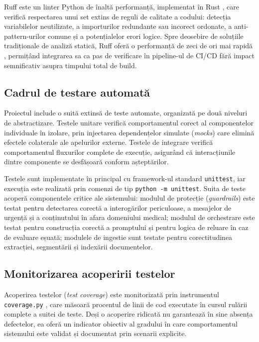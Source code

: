 \documentclass[12pt, a4paper, oneside, romanian]{teza-upb}
\begin{document}
Ruff este un linter Python de înaltă performanță, implementat în Rust \cite{ruff_doc}, care verifică respectarea unui set extins de reguli de calitate a codului: detecția variabilelor neutilizate, a importurilor redundante sau incorect ordonate, a anti-pattern-urilor comune și a potențialelor erori logice. Spre deosebire de soluțiile tradiționale de analiză statică, Ruff oferă o performanță de zeci de ori mai rapidă \cite{ruff_doc}, permițând integrarea sa ca pas de verificare în pipeline-ul de CI/CD fără impact semnificativ asupra timpului total de build.

\subsection{Cadrul de testare automată}

Proiectul include o suită extinsă de teste automate, organizată pe două niveluri de abstractizare. Testele unitare verifică comportamentul corect al componentelor individuale în izolare, prin injectarea dependențelor simulate (\textit{mocks}) care elimină efectele colaterale ale apelurilor externe. Testele de integrare verifică comportamentul fluxurilor complete de execuție, asigurând că interacțiunile dintre componente se desfășoară conform așteptărilor.

Testele sunt implementate în principal cu framework-ul standard \texttt{unittest}, iar execuția este realizată prin comenzi de tip \texttt{python -m unittest}. Suita de teste acoperă componentele critice ale sistemului: modulul de protecție (\textit{guardrails}) este testat pentru detectarea corectă a interogărilor periculoase, a mesajelor de urgență și a conținutului în afara domeniului medical; modulul de orchestrare este testat pentru construcția corectă a promptului și pentru logica de reluare în caz de evaluare eșuată; modulele de ingestie sunt testate pentru corectitudinea extracției, segmentării și indexării documentelor.

\subsection{Monitorizarea acoperirii testelor}

Acoperirea testelor (\textit{test coverage}) este monitorizată prin instrumentul \texttt{coverage.py} \cite{coveragepy_doc}, care măsoară procentul de linii de cod executate în cursul rulării complete a suitei de teste. Deși o acoperire ridicată nu garantează în sine absența defectelor, ea oferă un indicator obiectiv al gradului în care comportamentul sistemului este validat și documentat prin scenarii explicite.
\end{document}
